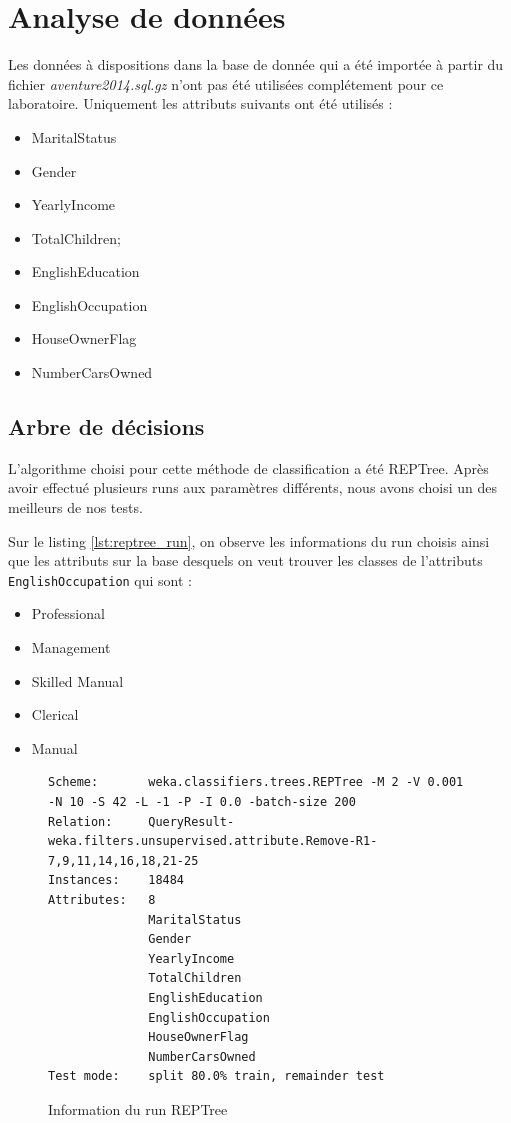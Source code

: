 \chapter{Analyse de données}

Les données à dispositions dans la base de donnée qui a été importée à partir du fichier \textit{aventure2014.sql.gz} n'ont pas été utilisées complétement pour ce laboratoire. Uniquement les attributs suivants ont été utilisés :

\begin{itemize}
	\item MaritalStatus
	\item Gender
	\item YearlyIncome
	\item TotalChildren;
	\item EnglishEducation
	\item EnglishOccupation
	\item HouseOwnerFlag
	\item NumberCarsOwned
\end{itemize}


\section{Arbre de décisions}

L'algorithme choisi pour cette méthode de classification a été REPTree. Après avoir effectué plusieurs runs aux paramètres différents, nous avons choisi un des meilleurs de nos tests.

Sur le listing \autoref{lst:reptree_run}, on observe les informations du run choisis ainsi que les attributs sur la base desquels on veut trouver les classes de l'attributs \texttt{EnglishOccupation} qui sont :

\begin{itemize}
	\item Professional
	\item Management
	\item Skilled Manual
	\item Clerical
	\item Manual
\end{itemize}

\begin{figure}[H]
\centering
\begin{lstlisting}
Scheme:       weka.classifiers.trees.REPTree -M 2 -V 0.001 -N 10 -S 42 -L -1 -P -I 0.0 -batch-size 200
Relation:     QueryResult-weka.filters.unsupervised.attribute.Remove-R1-7,9,11,14,16,18,21-25
Instances:    18484
Attributes:   8
              MaritalStatus
              Gender
              YearlyIncome
              TotalChildren
              EnglishEducation
              EnglishOccupation
              HouseOwnerFlag
              NumberCarsOwned
Test mode:    split 80.0% train, remainder test
\end{lstlisting}
\caption{Information du run REPTree}
\label{lst:reptree_run}
\end{figure}

